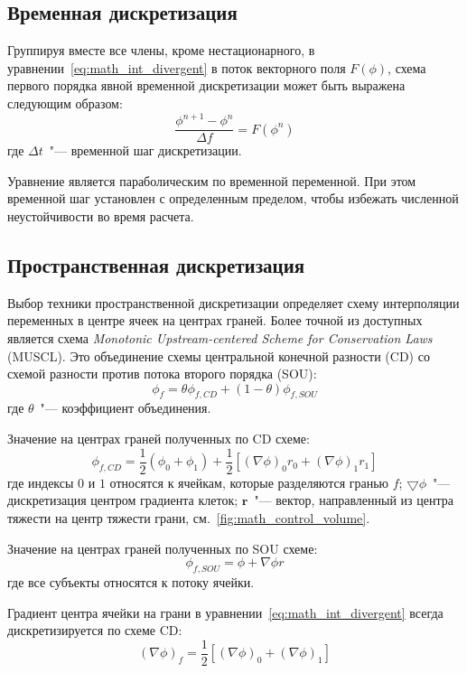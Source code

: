 \subsection{Временная дискретизация}

Группируя вместе все члены, кроме нестационарного,
в уравнении~\eqref{eq:math_int_divergent}  в поток векторного поля \(F(\phi)\), схема первого порядка явной временной дискретизации может быть выражена следующим образом:
\begin{equation}
 \frac{{\phi }^{n+1}-{\phi }^{n}}{\Delta f}=F\left({\phi }^{n}\right) 
\end{equation}
где \(\Delta t\)~"--- временной шаг дискретизации. 

Уравнение является параболическим по временной переменной. %
При этом временной шаг установлен с определенным пределом, чтобы избежать численной неустойчивости во время расчета.

\subsection{Пространственная дискретизация}

Выбор техники пространственной дискретизации определяет схему интерполяции переменных в центре ячеек на центрах граней.
Более точной из доступных является схема \textit{Monotonic Upstream-centered Scheme for Conservation Laws}
(MUSCL). 
Это объединение схемы центральной конечной разности  (CD) со схемой  разности против потока второго порядка (SOU):
\begin{equation}
 {\phi }_{f}=\theta {\phi }_{f,CD}+\left(1-\theta \right){\phi }_{f,SOU} 
\end{equation}
где \(\theta\)~"--- коэффициент объединения.

Значение на центрах граней полученных по CD схеме:
\begin{equation}
{\phi }_{f,CD}=  \frac{1}{2}\left({\phi }_{0}+{\phi }_{1}\right)+\frac{1}{2}\left[{\left(\nabla \phi \right)}_{0}{r}_{0}+{\left(\nabla \phi \right)}_{1}{r}_{1}\right] 
\end{equation}
где индексы \(0\) и \(1\) относятся к ячейкам, которые разделяются гранью \(f\); \(\bigtriangledown \phi\)~"--- дискретизация центром градиента клеток; \(\boldsymbol r\)~"--- вектор, направленный из центра тяжести на центр тяжести грани, см.~\cref{fig:math_control_volume}.

Значение на центрах граней полученных по SOU схеме:
\begin{equation}
{\phi }_{f,SOU}= \phi +\nabla \phi r 
\end{equation}
где все субъекты относятся к потоку ячейки.

Градиент центра ячейки на грани в уравнении~\eqref{eq:math_int_divergent} всегда дискретизируется по схеме CD:
\begin{equation}
 {\left(\nabla \phi \right)}_{f} = \frac{1}{2}\left[{\left(\nabla \phi \right)}_{0}+{\left(\nabla \phi \right)}_{1}\right]
\end{equation}
